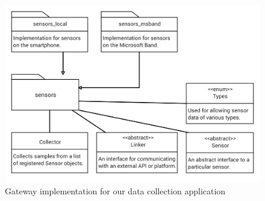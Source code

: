 \begin{figure}
	\includegraphics[width=1.0\textwidth]{../figs/gateway}
	\caption{Gateway implementation for our data collection application}
	\label{fig:gateway}
\end{figure}
